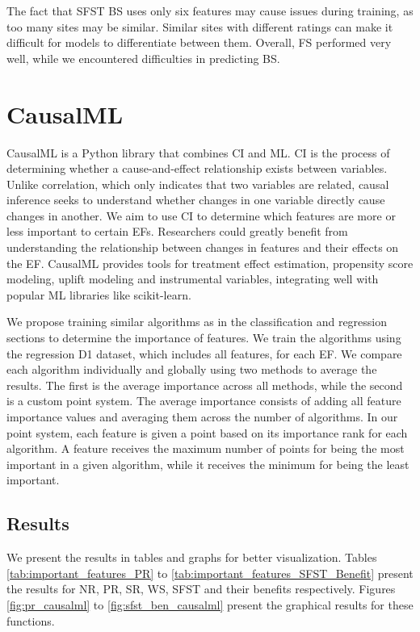 \documentclass[12pt,letterpaper]{article}
\begin{document}
The fact that \ac{SFST} \ac{BS} uses only six features may cause issues during training, as too many sites may be similar.
Similar sites with different ratings can make it difficult for models to differentiate between them.
Overall, \ac{FS} performed very well, while we encountered difficulties in predicting \ac{BS}.


\section{CausalML}
CausalML is a Python library that combines \ac{CI} and \ac{ML}.
\ac{CI} is the process of determining whether a cause-and-effect relationship exists between variables.
Unlike correlation, which only indicates that two variables are related, causal inference seeks to understand whether changes in one variable directly cause changes in another.
We aim to use \ac{CI} to determine which features are more or less important to certain \ac{EF}s.
Researchers could greatly benefit from understanding the relationship between changes in features and their effects on the \ac{EF}.
CausalML provides tools for treatment effect estimation, propensity score modeling, uplift modeling and instrumental variables, integrating well with popular \ac{ML} libraries like scikit-learn.

We propose training similar algorithms as in the classification and regression sections to determine the importance of features.
We train the algorithms using the regression D1 dataset, which includes all features, for each \ac{EF}.
We compare each algorithm individually and globally using two methods to average the results.
The first is the average importance across all methods, while the second is a custom point system.
The average importance consists of adding all feature importance values and averaging them across the number of algorithms.
In our point system, each feature is given a point based on its importance rank for each algorithm.
A feature receives the maximum number of points for being the most important in a given algorithm, while it receives the minimum for being the least important.

\subsection{Results}
We present the results in tables and graphs for better visualization.
Tables \ref{tab:important_features_PR} to \ref{tab:important_features_SFST_Benefit} present the results for \ac{NR}, \ac{PR}, \ac{SR}, \ac{WS}, \ac{SFST} and their benefits respectively.
Figures \ref{fig:pr_causalml} to \ref{fig:sfst_ben_causalml} present the graphical results for these functions.
\end{document}
